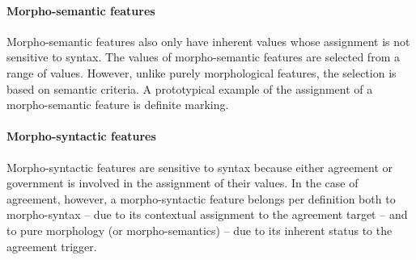 \paragraph{Morpho-semantic features} Morpho-semantic features also only have inherent values whose assignment is not sensitive to syntax. The values of morpho-semantic features are selected from a range of values. However, unlike purely morphological features, the selection is based on semantic criteria. A prototypical example of the assignment of a morpho-semantic feature is definite marking.

\paragraph{Morpho-syntactic features} Morpho-syntactic features are sensitive to syntax because either agreement or government is involved in the assignment of their values. In the case of agreement, however, a morpho-syntactic feature belongs per definition both to morpho-syntax – due to its contextual assignment to the agreement target – and to pure morphology (or morpho-semantics) – due to its inherent status to the agreement trigger.

